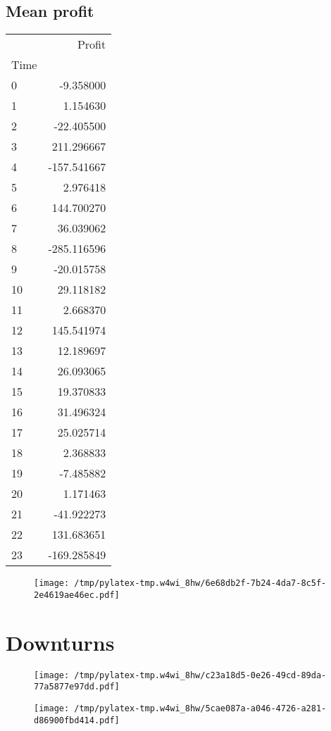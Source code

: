 \documentclass{article}%
\begin{document}
%
\newpage %
\subsection{Mean profit }%
\label{subsec:Meanprofit}%
\begin{tabular}{lr}
\toprule
{} &      Profit \\
Time &             \\
\midrule
0    &   -9.358000 \\
1    &    1.154630 \\
2    &  -22.405500 \\
3    &  211.296667 \\
4    & -157.541667 \\
5    &    2.976418 \\
6    &  144.700270 \\
7    &   36.039062 \\
8    & -285.116596 \\
9    &  -20.015758 \\
10   &   29.118182 \\
11   &    2.668370 \\
12   &  145.541974 \\
13   &   12.189697 \\
14   &   26.093065 \\
15   &   19.370833 \\
16   &   31.496324 \\
17   &   25.025714 \\
18   &    2.368833 \\
19   &   -7.485882 \\
20   &    1.171463 \\
21   &  -41.922273 \\
22   &  131.683651 \\
23   & -169.285849 \\
\bottomrule
\end{tabular}
%


\begin{figure}[htbp]%
\centering%
\texttt{[image: /tmp/pylatex-tmp.w4wi\_8hw/6e68db2f-7b24-4da7-8c5f-2e4619ae46ec.pdf]}%
\end{figure}

%
\section{Downturns}%
\label{sec:Downturns}%


\begin{figure}[htbp]%
\centering%
\texttt{[image: /tmp/pylatex-tmp.w4wi\_8hw/c23a18d5-0e26-49cd-89da-77a5877e97dd.pdf]}%
\end{figure}

%


\begin{figure}[htbp]%
\centering%
\texttt{[image: /tmp/pylatex-tmp.w4wi\_8hw/5cae087a-a046-4726-a281-d86900fbd414.pdf]}%
\end{figure}

%
\end{document}
